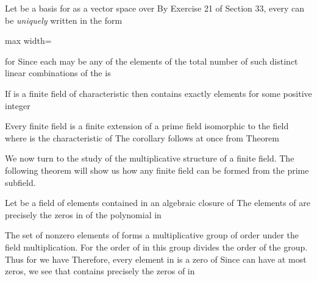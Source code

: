 \documentclass[11pt,oneside]{article}
\begin{document}
\begin{BookBody}

 Let  be a basis for  as a vector space over  By Exercise 21 of Section 33, every  can be\textit{ uniquely} written in the form

\begin{center}\begin{adjustbox}{max width=\linewidth}\end{adjustbox}\end{center}

\noindent for  Since each  may be any of the  elements of  the total number of such distinct linear combinations of the  is \BookEnd{\blacklozenge}

 If  is a finite field of characteristic  then  contains exactly  elements for some positive integer 

 Every finite field  is a finite extension of a prime field isomorphic to the field  where  is the characteristic of  The corollary follows at once from Theorem \BookEnd{\blacklozenge}

We now turn to the study of the multiplicative structure of a finite field. The following theorem will show us how any finite field can be formed from the prime subfield.

 Let  be a field of  elements contained in an algebraic closure  of  The elements of  are precisely the zeros in  of the polynomial  in 

 The set  of nonzero elements of  forms a multiplicative group of order  under the field multiplication. For  the order of \BookInline{\alpha } in this group divides the order  of the group. Thus for  we have  Therefore, every element in  is a zero of  Since  can have at most  zeros, we see that  contains precisely the zeros of  in \BookEnd{\blacklozenge}


\end{BookBody}
\end{document}
